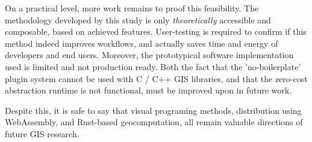 On a practical level, more work remains to proof this feasibility.
The methodology developed by this study is only \emph{theoretically} accessible and composable, based on achieved features. 
User-testing is required to confirm if this method indeed improves workflows, and actually saves time and energy of developers and end users. 
Moreover, the prototypical software implementation used is limited and not production ready.
Both the fact that the 'no-boilerplate' plugin system cannot be used with C / C++ \ac{GIS} libraries, and that the zero-cost abstraction runtime is not functional, must be improved upon in future work.

Despite this, it is safe to say that visual programing methods, distribution using WebAssembly, and Rust-based geocomputation, all remain valuable directions of future \ac{GIS} research.






